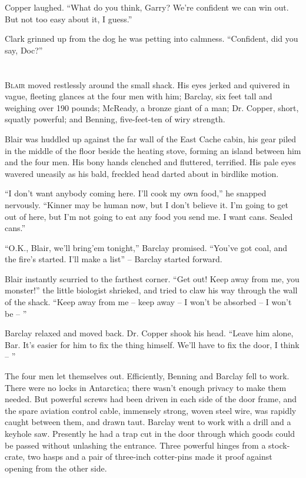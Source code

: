 \documentclass[letterpaper,openany,12pt]{memoir}		%
\begin{document}
Copper laughed. ``What do you think, Garry? We're confident we can win out. But
not too easy about it, I guess.''

Clark grinned up from the dog he was petting into calmness. ``Confident, did you
say, Doc?''


\chapter[Chapter 8]{}

\lettrine[lines=3,findent=2pt,nindent=2pt]{B}{lair} moved restlessly around the
small shack. His eyes jerked and quivered in vague, fleeting glances at the four
men with him; Barclay, six feet tall and weighing over 190 pounds; McReady, a
bronze giant of a man; Dr. Copper, short, squatly powerful; and Benning,
five-feet-ten of wiry strength.

Blair was huddled up against the far wall of the East Cache cabin, his gear
piled in the middle of the floor beside the heating stove, forming an island
between him and the four men. His bony hands clenched and fluttered, terrified.
His pale eyes wavered uneasily as his bald, freckled head darted about in
birdlike motion.

``I don't want anybody coming here. I'll cook my own food,'' he snapped
nervously. ``Kinner may be human now, but I don't believe it. I'm going to get
out of here, but I'm not going to eat any food you send me. I want cans. Sealed
cans.''

``O.K., Blair, we'll bring'em tonight,'' Barclay promised. ``You've got coal,
and the fire's started. I'll make a list'' -- Barclay started forward.

Blair instantly scurried to the farthest corner. ``Get out! Keep away from me,
you monster!'' the little biologist shrieked, and tried to claw his way through
the wall of the shack. ``Keep away from me -- keep away -- I won't be absorbed --
I won't be -- ''

Barclay relaxed and moved back. Dr. Copper shook his head. ``Leave him alone,
Bar. It's easier for him to fix the thing himself. We'll have to fix the door, I
think -- ''

The four men let themselves out. Efficiently, Benning and Barclay fell to work.
There were no locks in Antarctica; there wasn't enough privacy to make them
needed. But powerful screws had been driven in each side of the door frame, and
the spare aviation control cable, immensely strong, woven steel wire, was
rapidly caught between them, and drawn taut. Barclay went to work with a drill
and a keyhole saw. Presently he had a trap cut in the door through which goods
could be passed without unlashing the entrance. Three powerful hinges from a
stock-crate, two hasps and a pair of three-inch cotter-pins made it proof
against opening from the other side.
\end{document}
